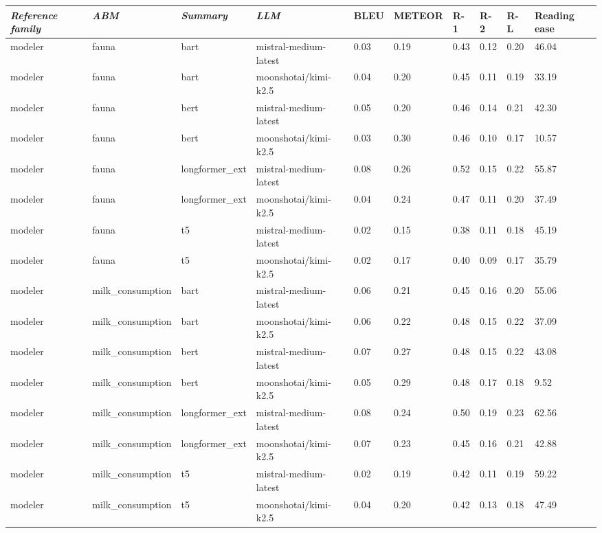 \begin{tabular}{|l|l|l|l|l|l|l|l|l|l|}
\hline
\textit{\textbf{Reference family}} & \textit{\textbf{ABM}} & \textit{\textbf{Summary}} & \textit{\textbf{LLM}} & BLEU & METEOR & R-1 & R-2 & R-L & Reading ease \\
 \hline
 modeler & fauna & bart & mistral-medium-latest & 0.03 & 0.19 & 0.43 & 0.12 & 0.20 & 46.04 \\
 \hline
 modeler & fauna & bart & moonshotai/kimi-k2.5 & 0.04 & 0.20 & 0.45 & 0.11 & 0.19 & 33.19 \\
 \hline
 modeler & fauna & bert & mistral-medium-latest & 0.05 & 0.20 & 0.46 & 0.14 & 0.21 & 42.30 \\
 \hline
 modeler & fauna & bert & moonshotai/kimi-k2.5 & 0.03 & 0.30 & 0.46 & 0.10 & 0.17 & 10.57 \\
 \hline
 modeler & fauna & longformer\_ext & mistral-medium-latest & 0.08 & 0.26 & 0.52 & 0.15 & 0.22 & 55.87 \\
 \hline
 modeler & fauna & longformer\_ext & moonshotai/kimi-k2.5 & 0.04 & 0.24 & 0.47 & 0.11 & 0.20 & 37.49 \\
 \hline
 modeler & fauna & t5 & mistral-medium-latest & 0.02 & 0.15 & 0.38 & 0.11 & 0.18 & 45.19 \\
 \hline
 modeler & fauna & t5 & moonshotai/kimi-k2.5 & 0.02 & 0.17 & 0.40 & 0.09 & 0.17 & 35.79 \\
 \hline
 modeler & milk\_consumption & bart & mistral-medium-latest & 0.06 & 0.21 & 0.45 & 0.16 & 0.20 & 55.06 \\
 \hline
 modeler & milk\_consumption & bart & moonshotai/kimi-k2.5 & 0.06 & 0.22 & 0.48 & 0.15 & 0.22 & 37.09 \\
 \hline
 modeler & milk\_consumption & bert & mistral-medium-latest & 0.07 & 0.27 & 0.48 & 0.15 & 0.22 & 43.08 \\
 \hline
 modeler & milk\_consumption & bert & moonshotai/kimi-k2.5 & 0.05 & 0.29 & 0.48 & 0.17 & 0.18 & 9.52 \\
 \hline
 modeler & milk\_consumption & longformer\_ext & mistral-medium-latest & 0.08 & 0.24 & 0.50 & 0.19 & 0.23 & 62.56 \\
 \hline
 modeler & milk\_consumption & longformer\_ext & moonshotai/kimi-k2.5 & 0.07 & 0.23 & 0.45 & 0.16 & 0.21 & 42.88 \\
 \hline
 modeler & milk\_consumption & t5 & mistral-medium-latest & 0.02 & 0.19 & 0.42 & 0.11 & 0.19 & 59.22 \\
 \hline
 modeler & milk\_consumption & t5 & moonshotai/kimi-k2.5 & 0.04 & 0.20 & 0.42 & 0.13 & 0.18 & 47.49 \\
\hline
\end{tabular}
